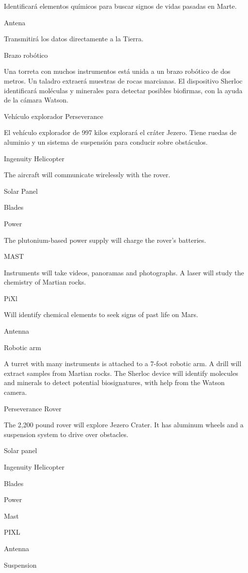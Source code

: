 Identificará elementos químicos para buscar signos de vidas pasadas en
Marte.

Antena

Transmitirá los datos directamente a la Tierra.

Brazo robótico

Una torreta con muchos instrumentos está unida a un brazo robótico de
dos metros. Un taladro extraerá muestras de rocas marcianas. El
dispositivo Sherloc identificará moléculas y minerales para detectar
posibles biofirmas, con la ayuda de la cámara Watson.

Vehículo explorador Perseverance

El vehículo explorador de 997 kilos explorará el cráter Jezero. Tiene
ruedas de aluminio y un sistema de suspensión para conducir sobre
obstáculos.

Ingenuity Helicopter

The aircraft will communicate wirelessly with the rover.

Solar Panel

Blades

Power

The plutonium-based power supply will charge the rover's batteries.

MAST

Instruments will take videos, panoramas and photographs. A laser will
study the chemistry of Martian rocks.

PiXl

Will identify chemical elements to seek signs of past life on Mars.

Antenna

Robotic arm

A turret with many instruments is attached to a 7-foot robotic arm. A
drill will extract samples from Martian rocks. The Sherloc device will
identify molecules and minerals to detect potential biosignatures, with
help from the Watson camera.

Perseverance Rover

The 2,200 pound rover will explore Jezero Crater. It has aluminum wheels
and a suspension system to drive over obstacles.

Solar panel

Ingenuity Helicopter

Blades

Power

Mast

PIXL

Antenna

Suspension

